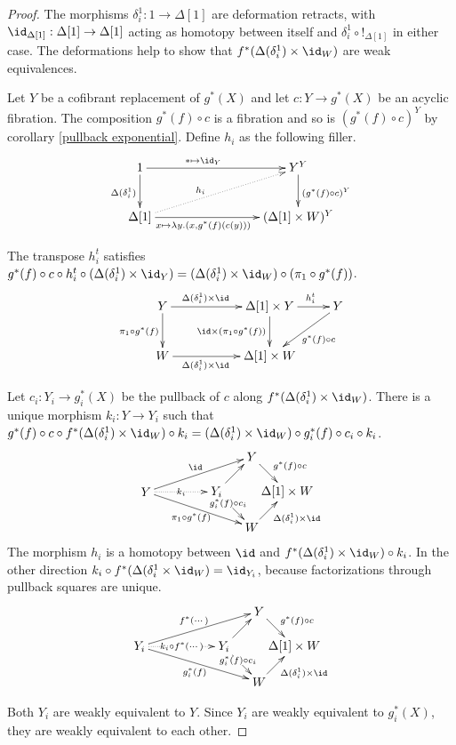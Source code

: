 \documentclass{tac}
\newcommand\ri{^*}
\newcommand\bang{!}
\newcommand\of{:}
\newcommand\simplex\Delta
\begin{document}
\begin{proof} The morphisms $\delta^1_i\of 1\to \simplex[1]$ are deformation retracts, with $\id_{\simplex[1]}\of\simplex[1]\to\simplex[1]$ acting as homotopy between itself and $\delta^1_i\circ\bang_{\simplex[1]}$ in either case. The deformations help to show that $f\ri(\simplex(\delta^1_i)\times \id_W)$ are weak equivalences.

Let $Y$ be a cofibrant replacement of $g\ri(X)$ and let $c\of Y\to g\ri(X)$ be an acyclic fibration. The composition $g\ri(f)\circ c$ is a fibration and so is $(g\ri(f)\circ c)^Y$ by corollary \ref{pullback exponential}. Define $h_i$ as the following filler.
\[\xymatrix{
1\ar[d]_{\simplex(\delta^1_i)} \ar[rrr]^(.4){*\mapsto \id_Y} &&& Y^Y \ar[d]^{(g\ri(f)\circ c)^Y}\\
\simplex[1]\ar[rrr]_(.4){x\mapsto \lambda y.(x,g\ri(f)(c(y)))}\ar@{.>}[urrr]^(.4){h_i} &&& (\simplex[1]\times W)^Y
}\]

The transpose $h^t_i$ satisfies $g\ri(f)\circ c\circ h^t_i\circ(\simplex(\delta^1_{i})\times \id_Y) = (\simplex(\delta^1_{i})\times \id_W)\circ (\pi_1\circ g\ri(f))$.
\[ \xymatrix{
Y \ar[rr]^(.4){\simplex(\delta^1_{i})\times \id}\ar[d]_{\pi_1\circ g\ri(f)} && \simplex[1]\times Y \ar[r]^(.6){h^t_i}\ar[d]_{\id\times(\pi_1\circ g\ri(f)) } & Y\ar[dl]^{g\ri(f)\circ c} \\
W \ar[rr]_(.4){\simplex(\delta^1_{i})\times \id} &&\simplex[1]\times W
}\]

Let $c_i\of Y_i\to g_i\ri(X)$ be the pullback of $c$ along $f\ri(\simplex(\delta^1_{i})\times \id_W)$. 
There is a unique morphism $k_i\of  Y\to Y_i$ such that $g\ri(f)\circ c\circ f\ri(\simplex(\delta^1_{i})\times \id_W)\circ k_i = (\simplex(\delta^1_{i})\times \id_W)\circ g_i\ri(f) \circ c_i\circ k_i$.
\[\xy
(0,10)*+{Y}="left",(20,10)*+{Y_i}="center",(30,0)*+{W}="bottom",(30,20)*+{Y}="top",(40,10)*+{\simplex[1]\times W}="right"
\ar^\id "left";"top" \ar@{.>}|{k_i} "left";"center" \ar_{\pi_1\circ g\ri(f)} "left";"bottom"
\ar "center";"top" \ar|(.33){g_i\ri(f)\circ c_i} "center";"bottom"
\ar^{g\ri(f)\circ c} "top";"right" \ar_{\simplex(\delta^1_{i})\times \id} "bottom";"right"
\endxy\]
The morphism $h_i$ is a homotopy between $\id$ and $f\ri(\simplex(\delta^1_{i})\times \id_W)\circ k_i$. In the other direction $k_i\circ f\ri(\simplex(\delta^1_{i}\times \id_W) = \id_{Y_i}$, because factorizations through pullback squares are unique.
\[\xy
(0,10)*+{Y_i}="left",(24,10)*+{Y_i}="center",(34,0)*+{W}="bottom",(34,20)*+{Y}="top",(44,10)*+{\simplex[1]\times W}="right"
\ar^{f\ri(\dotsm)} "left";"top" \ar@{.>}|{k_i\circ f\ri(\dotsm)} "left";"center" \ar_{g_i\ri(f)} "left";"bottom"
\ar "center";"top" \ar|(.4){g_i\ri(f)\circ c_i} "center";"bottom"
\ar^{g\ri(f)\circ c} "top";"right" \ar_{\simplex(\delta^1_{i})\times \id} "bottom";"right"
\endxy\]

Both $Y_i$ are weakly equivalent to $Y$. Since $Y_i$ are weakly equivalent to $g_i\ri(X)$, they are weakly equivalent to each other. %
\end{proof}
\end{document}
